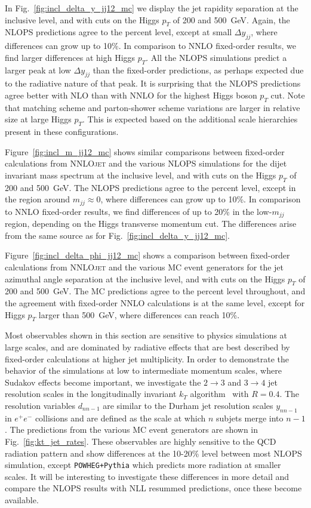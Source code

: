 \documentclass[10pt,prd,fleqn,superscriptaddress,notitlepage,nofootinbib,preprintnumbers,nobalancelastpage]{revtex4-1}
\newcommand{\NNLOJET}{\textsc{NNLOjet}\xspace}
\begin{document}
In Fig.~\ref{fig:incl_delta_y_jj12_mc} we display the jet rapidity separation at the inclusive level, and with cuts on the Higgs $p_T$ of 200 and 500~GeV. Again, the NLOPS predictions agree to the percent level, except at small $\Delta y_{jj}$, where differences can grow up to 10\%. In comparison to NNLO fixed-order results, we find larger differences at high Higgs $p_T$. All the NLOPS simulations predict a larger peak at low $\Delta y_{jj}$ than the fixed-order predictions, as perhaps expected due to the radiative nature of that peak. It is surprising that the NLOPS predictions agree better with NLO than with NNLO for the highest Higgs boson $p_T$ cut. Note that matching scheme and parton-shower scheme variations are larger in relative size at large Higgs $p_T$. This is expected based on the additional scale hierarchies present in these configurations.

Figure~\ref{fig:incl_m_jj12_mc} shows similar comparisons between fixed-order calculations from \NNLOJET and the various NLOPS simulations for the dijet invariant mass spectrum at the inclusive level, and with cuts on the Higgs $p_T$ of 200 and 500~GeV. The NLOPS predictions agree to the percent level, except in the region around $m_{jj}\approx0$, where differences can grow up to 10\%. In comparison to NNLO fixed-order results, we find differences of up to 20\% in the low-$m_{jj}$ region, depending on the Higgs transverse momentum cut. The differences arise from the same source as for Fig.~\ref{fig:incl_delta_y_jj12_mc}.



Figure~\ref{fig:incl_delta_phi_jj12_mc} shows a comparison between fixed-order calculations from \NNLOJET and the various MC event generators for the jet azimuthal angle separation at the inclusive level, and with cuts on the Higgs $p_T$ of 200 and 500~GeV. The MC predictions agree to the percent level throughout, and the agreement with fixed-order NNLO calculations is at the same level, except for Higgs $p_T$ larger than 500~GeV, where differences can reach 10\%.


Most observables shown in this section are sensitive to physics simulations
at large scales, and are dominated by radiative effects that are best described by
fixed-order calculations at higher jet multiplicity. In order to demonstrate the
behavior of the simulations at low to intermediate momentum scales, where Sudakov
effects become important, we investigate the $2\to3$ and $3\to4$ jet resolution scales
in the longitudinally invariant $k_T$ algorithm~\cite{Catani:1993hr} with $R=0.4$.
The resolution variables $d_{nn-1}$ are similar to the Durham jet resolution scales
$y_{nn-1}$ in $e^+e^-$ collisions and are defined as the scale at which $n$ subjets
merge into $n-1$. The predictions from the various MC event generators
are shown in Fig.~\ref{fig:kt_jet_rates}. These observables are highly sensitive
to the QCD radiation pattern and show differences at the 10-20\% level between most
NLOPS simulation, except {\tt POWHEG+Pythia} which predicts more radiation at smaller scales.
It will be interesting to investigate these differences in more detail and compare
the NLOPS results with NLL resummed predictions, once these become available.
\end{document}
